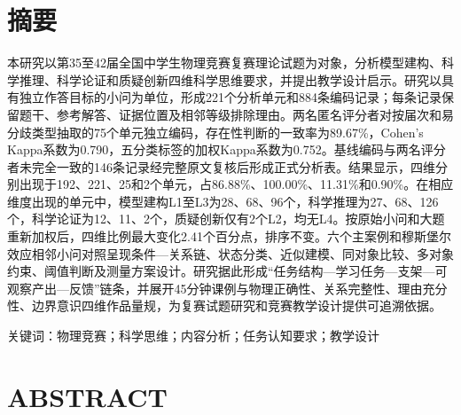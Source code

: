\documentclass[
  12pt,
  a4paper,twoside,openany]{ctexbook}
\begin{document}
\setcounter{page}{1}
\pagestyle{fancy}
\chapter*{摘要}\label{ux6458ux8981}

本研究以第35至42届全国中学生物理竞赛复赛理论试题为对象，分析模型建构、科学推理、科学论证和质疑创新四维科学思维要求，并提出教学设计启示。研究以具有独立作答目标的小问为单位，形成221个分析单元和884条编码记录；每条记录保留题干、参考解答、证据位置及相邻等级排除理由。两名匿名评分者对按届次和易分歧类型抽取的75个单元独立编码，存在性判断的一致率为89.67\%，Cohen's
Kappa系数为0.790，五分类标签的加权Kappa系数为0.752。基线编码与两名评分者未完全一致的146条记录经完整原文复核后形成正式分析表。结果显示，四维分别出现于192、221、25和2个单元，占86.88\%、100.00\%、11.31\%和0.90\%。在相应维度出现的单元中，模型建构L1至L3为28、68、96个，科学推理为27、68、126个，科学论证为12、11、2个，质疑创新仅有2个L2，均无L4。按原始小问和大题重新加权后，四维比例最大变化2.41个百分点，排序不变。六个主案例和穆斯堡尔效应相邻小问对照呈现条件---关系链、状态分类、近似建模、同对象比较、多对象约束、阈值判断及测量方案设计。研究据此形成``任务结构---学习任务---支架---可观察产出---反馈''链条，并展开45分钟课例与物理正确性、关系完整性、理由充分性、边界意识四维作品量规，为复赛试题研究和竞赛教学设计提供可追溯依据。

关键词：物理竞赛；科学思维；内容分析；任务认知要求；教学设计

\chapter*{ABSTRACT}\begingroup{}\label{abstract}
\end{document}
